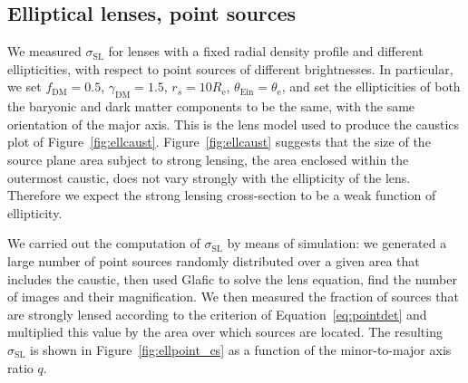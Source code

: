 \documentclass{aa}
\def\reff{R_{\mathrm{e}}}
\def\gammadm{\gamma_{\mathrm{DM}}}
\def\fdm{f_{\mathrm{DM}}}
\def\tein{\theta_{\mathrm{Ein}}}
\def\teff{\theta_{\mathrm{e}}}
\def\crosssect{\sigma_\mathrm{{SL}}}
\def\Fref#1{Figure~\ref{#1}\xspace}
\def\Eref#1{Equation~\ref{#1}\xspace}
\begin{document}
\subsection{Elliptical lenses, point sources}\label{ssec:ellpoint}

We measured $\crosssect$ for lenses with a fixed radial density profile and different ellipticities, with respect to point sources of different brightnesses.
In particular, we set $\fdm=0.5$, $\gammadm=1.5$, $r_s=10\reff$, $\tein=\teff$, and set the ellipticities of both the baryonic and dark matter components to be the same, with the same orientation of the major axis.
This is the lens model used to produce the caustics plot of \Fref{fig:ellcaust}.
\Fref{fig:ellcaust} suggests that the size of the source plane area subject to strong lensing, the area enclosed within the outermost caustic, does not vary strongly with the ellipticity of the lens.
Therefore we expect the strong lensing cross-section to be a weak function of ellipticity.

We carried out the computation of $\crosssect$ by means of simulation: we generated a large number of point sources randomly distributed over a given area that includes the caustic, then used {\sc Glafic} to solve the lens equation, find the number of images and their magnification. We then measured the fraction of sources that are strongly lensed according to the criterion of \Eref{eq:pointdet} and multiplied this value by the area over which sources are located.
The resulting $\crosssect$ is shown in \Fref{fig:ellpoint_cs} as a function of the minor-to-major axis ratio $q$.
\end{document}
